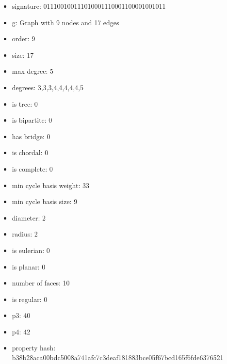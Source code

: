 \newpage
\begin{figure}
\end{figure}
\begin{itemize}
\item signature: 011100100111010001110001100001001011
\item g: Graph with 9 nodes and 17 edges
\item order: 9
\item size: 17
\item max degree: 5
\item degrees: 3,3,3,4,4,4,4,4,5
\item is tree: 0
\item is bipartite: 0
\item has bridge: 0
\item is chordal: 0
\item is complete: 0
\item min cycle basis weight: 33
\item min cycle basis size: 9
\item diameter: 2
\item radius: 2
\item is eulerian: 0
\item is planar: 0
\item number of faces: 10
\item is regular: 0
\item p3: 40
\item p4: 42
\item property hash: b38b28aca00bdc5008a741afc7c3deaf181883bce05f67bcd165f6fde6376521
\end{itemize}
